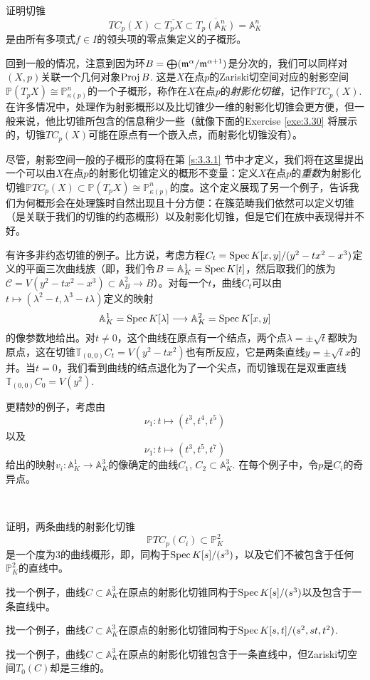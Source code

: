 \begin{exe}\label{exe:3.29}
	证明切锥
	\[
		TC_p(X)\subset \overline{T_pX}\subset \overline{T_p(\mathbb A_K^n)}=\mathbb A_K^n
	\]
	是由所有多项式$f\in I$的领头项的零点集定义的子概形。
\end{exe}

回到一般的情况，注意到因为环$B=\bigoplus (\mathfrak{m}^\alpha/\mathfrak{m}^{\alpha+1})$是分次的，我们可以同样对$(X,p)$关联一个几何对象$\operatorname{Proj} B$. 这是$X$在点$p$的Zariski切空间对应的射影空间$\mathbb P(T_p X)\cong \mathbb P^n_{\kappa(p)}$的一个子概形，称作在$X$在点$p$的\textit{射影化切锥}，记作$\mathbb PTC_p(X)$. 在许多情况中，处理作为射影概形以及比切锥少一维的射影化切锥会更方便，但一般来说，他比切锥所包含的信息稍少一些（就像下面的Exercise \ref{exe:3.30} 将展示的，切锥$TC_p(X)$可能在原点有一个嵌入点，而射影化切锥没有）。

尽管，射影空间一般的子概形的度将在第 \ref{s:3.3.1} 节中才定义，我们将在这里提出一个可以由$X$在点$p$的射影化切锥定义的概形不变量：定义$X$在点$p$的\textit{重数}为射影化切锥$\mathbb PTC_p(X)\subset \mathbb P(T_p X)\cong \mathbb P^n_{\kappa(p)}$的度。这个定义展现了另一个例子，告诉我们为何概形会在处理簇时自然出现且十分方便：在簇范畴我们依然可以定义切锥（是关联于我们的切锥的约态概形）以及射影化切锥，但是它们在族中表现得并不好。


有许多非约态切锥的例子。比方说，考虑方程$C_t=\operatorname{Spec} K[x,y]/(y^2-tx^2-x^3)$定义的平面三次曲线族（即，我们令$B=\mathbb A^1_K=\operatorname{Spec} K[t]$，然后取我们的族为$\mathscr C=V(y^2-tx^2-x^3)\subset \mathbb A_B^2\to B$）。对每一个$t$，曲线$C_t$可以由$t\mapsto (\lambda^2-t,\lambda^3-t\lambda)$定义的映射
\[
	\mathbb A_K^1=\operatorname{Spec} K[\lambda]\longrightarrow \mathbb A_K^2=\operatorname{Spec} K[x,y]
\]
的像参数地给出。对$t\neq 0$，这个曲线在原点有一个结点，两个点$\lambda =\pm \sqrt t$都映为原点，这在切锥$\mathbb T_{(0,0)}C_t=V(y^2-tx^2)$也有所反应，它是两条直线$y=\pm \sqrt t x$的并。当$t=0$，我们看到曲线的结点退化为了一个尖点，而切锥现在是双重直线$\mathbb T_{(0,0)}C_0=V(y^2)$.

更精妙的例子，考虑由
\[
	\nu_1:t\longmapsto (t^3,t^4,t^5)
\]
以及
\[
	\nu_1:t\longmapsto (t^3,t^5,t^7)
\]
给出的映射$v_i:\mathbb A_K^1\to \mathbb A_K^3$的像确定的曲线$C_1$, $C_2\subset \mathbb A_K^3$. 在每个例子中，令$p$是$C_i$的奇异点。

\begin{exe}~\label{exe:3.30}
	\begin{compactenum}[(a)]
		\item 证明，两条曲线的射影化切锥
		\[
			\mathbb PTC_p(C_i)\subset \mathbb P_K^2
		\]
		是一个度为$3$的曲线概形，即，同构于$\operatorname{Spec} K[s]/(s^3)$，以及它们不被包含于任何$\mathbb P_K^2$的直线中。
		\item 找一个例子，曲线$C\subset \mathbb A_K^3$在原点的射影化切锥同构于$\operatorname{Spec} K[s]/(s^3)$以及包含于一条直线中。
		\item 找一个例子，曲线$C\subset \mathbb A_K^3$在原点的射影化切锥同构于$\operatorname{Spec} K[s,t]/(s^2,st,t^2)$.
		\item 找一个例子，曲线$C\subset \mathbb A_K^3$在原点的射影化切锥包含于一条直线中，但Zariski切空间$T_0(C)$却是三维的。
	\end{compactenum}
\end{exe}

